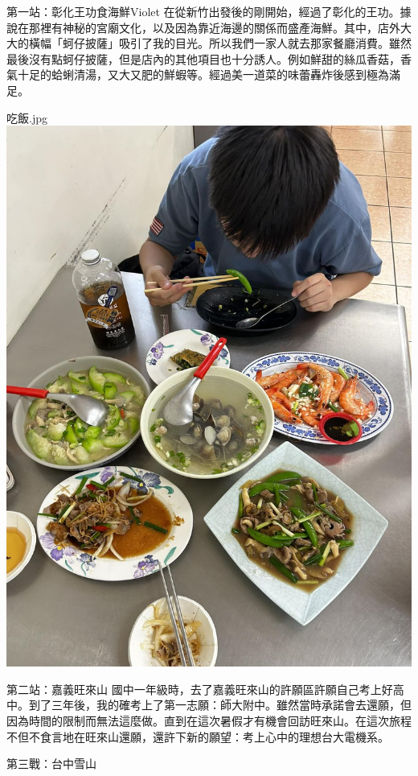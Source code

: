 \documentclass{article}
\begin{document}

\begin{large}
\begin{boxpar}{第一站：彰化王功食海鮮}{Violet}
在從新竹出發後的剛開始，經過了彰化的王功。據說在那裡有神秘的宮廟文化，以及因為靠近海邊的關係而盛產海鮮。其中，店外大大的橫幅「蚵仔披薩」吸引了我的目光。所以我們一家人就去那家餐廳消費。雖然最後沒有點蚵仔披薩，但是店內的其他項目也十分誘人。例如鮮甜的絲瓜香菇，香氣十足的蛤蜊清湯，又大又肥的鮮蝦等。經過美一道菜的味蕾轟炸後感到極為滿足。
\begin{imgbox}{吃飯.jpg}
    \includegraphics[width=0.65\textheight]{src/seafood.jpg}
\end{imgbox}

\end{boxpar}
    \begin{boxpar}{第二站：嘉義旺來山}
        國中一年級時，去了嘉義旺來山的許願區許願自己考上好高中。到了三年後，我的確考上了第一志願：師大附中。雖然當時承諾會去還願，但因為時間的限制而無法這麼做。直到在這次暑假才有機會回訪旺來山。在這次旅程不但不食言地在旺來山還願，還許下新的願望：考上心中的理想台大電機系。
    \end{boxpar}
    \begin{boxpar}{第三戰：台中雪山}
    \end{boxpar}

\end{large}
\end{document}
